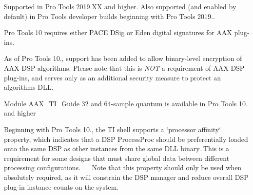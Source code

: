 \begin{DoxyRefList}
\label{a00801__compatibility_notes000019}%
%
 Supported in Pro Tools 2019.\+XX and higher. Also supported (and enabled by default) in Pro Tools developer builds beginning with Pro Tools 2019..

\label{a00801__compatibility_notes000011}%
%
 Pro Tools 10 requires either PACE DSig or Eden digital signatures for AAX plug-\/ins.

\label{a00801__compatibility_notes000012}%
%
 As of Pro Tools 10., support has been added to allow binary-\/level encryption of AAX DSP algorithms. Please note that this is {\itshape NOT} a requirement of AAX DSP plug-\/ins, and serves only as an additional security measure to protect an algorithm\textquotesingle{}s DLL. 
\item[Module \mbox{\hyperlink{a00848}{AAX\+\_\+\+TI\+\_\+\+Guide}} ]\label{a00801__compatibility_notes000023}%
%
 32 and 64-\/sample quantum is available in Pro Tools 10. and higher

\label{a00801__compatibility_notes000025}%
%
 Beginning with Pro Tools 10., the TI shell supports a \char`\"{}processor affinity\char`\"{} property, which indicates that a DSP Process\+Proc should be preferentially loaded onto the same DSP as other instances from the same DLL binary. This is a requirement for some designs that must share global data between different processing configurations.~\newline
 ~\newline
 Note that this property should only be used when absolutely required, as it will constrain the DSP manager and reduce overall DSP plug-\/in instance counts on the system.


\end{DoxyRefList}
